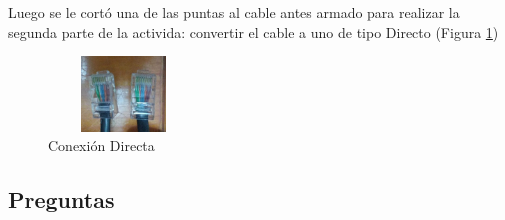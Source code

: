 \documentclass{article}
\begin{document}
Luego se le cortó una de las puntas al cable antes armado para realizar la segunda parte de la activida: convertir el cable a uno de tipo Directo (Figura \ref{fig:direc})

\begin{figure}[h!]
\centering
\includegraphics[scale=0.3 ,width=4cm, height=2cm]{directo.jpg}
\caption{Conexión Directa}
\label{fig:direc}
\end{figure}
\newpage

\subsection{Preguntas\vspace{0.3cm}}
\end{document}
